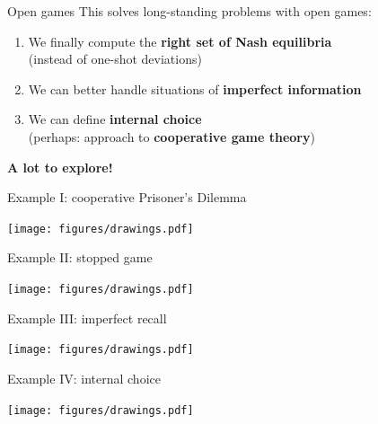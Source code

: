 \begin{frame}{Open games}
	This solves long-standing problems with open games:

	\vfill
	\begin{enumerate}
		\item We finally compute the \textbf{right set of Nash equilibria}\\
		(instead of one-shot deviations)
		\item We can better handle situations of \textbf{imperfect information}
		\item We can define \textbf{internal choice}\\
		(perhaps: approach to \textbf{cooperative game theory})
	\end{enumerate}

	\vfill
	\begin{center}
	\bfseries
	\large
		A lot to explore!
	\end{center}
\end{frame}

\begin{frame}{Example I: cooperative Prisoner's Dilemma}
	\begin{center}
		\texttt{[image: figures/drawings.pdf]}
	\end{center}
\end{frame}

\begin{frame}{Example II: stopped game}
	\begin{center}
		\texttt{[image: figures/drawings.pdf]}
	\end{center}
\end{frame}

\begin{frame}{Example III: imperfect recall}
	\begin{center}
		\texttt{[image: figures/drawings.pdf]}
	\end{center}
\end{frame}

\begin{frame}{Example IV: internal choice}
	\begin{center}
		\texttt{[image: figures/drawings.pdf]}
	\end{center}
\end{frame}
